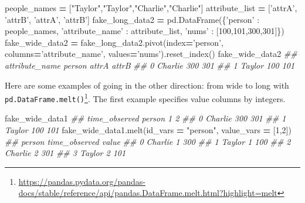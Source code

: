 \documentclass[12pt,krantz2]{krantz}
\makeatletter
\newenvironment{Shaded}{\begin{snugshade}}{\end{snugshade}}
\newcommand{\CommentTok}[1]{\textcolor[rgb]{0.37,0.37,0.37}{\textit{#1}}}
\newcommand{\DecValTok}[1]{\textcolor[rgb]{0.06,0.06,0.06}{#1}}
\newcommand{\NormalTok}[1]{#1}
\newcommand{\OperatorTok}[1]{\textcolor[rgb]{0.43,0.43,0.43}{\textbf{#1}}}
\newcommand{\StringTok}[1]{\textcolor[rgb]{0.5,0.5,0.5}{#1}}
\renewcommand{\href}[2]{#2\footnote{\url{#1}}}
\newenvironment{kframe}{%
\medskip{}
\setlength{\fboxsep}{.8em}
 \def\at@end@of@kframe{}%
 \ifinner\ifhmode%
  \def\at@end@of@kframe{\end{minipage}}%
  \begin{minipage}{\columnwidth}%
 \fi\fi%
 \def\FrameCommand##1{\hskip\@totalleftmargin \hskip-\fboxsep
 \colorbox{shadecolor}{##1}\hskip-\fboxsep
     \hskip-\linewidth \hskip-\@totalleftmargin \hskip\columnwidth}%
 \MakeFramed {\advance\hsize-\width
   \@totalleftmargin\z@ \linewidth\hsize
   \@setminipage}}%
 {\par\unskip\endMakeFramed%
 \at@end@of@kframe}
\renewenvironment{Shaded}{\begin{kframe}}{\end{kframe}}
\makeatother
\begin{document}
\begin{Shaded}
\begin{Highlighting}[]
\NormalTok{people_names }\OperatorTok{=}\NormalTok{ [}\StringTok{"Taylor"}\NormalTok{,}\StringTok{"Taylor"}\NormalTok{,}\StringTok{"Charlie"}\NormalTok{,}\StringTok{"Charlie"}\NormalTok{]}
\NormalTok{attribute_list }\OperatorTok{=}\NormalTok{ [}\StringTok{'attrA'}\NormalTok{, }\StringTok{'attrB'}\NormalTok{, }\StringTok{'attrA'}\NormalTok{, }\StringTok{'attrB'}\NormalTok{]}
\NormalTok{fake_long_data2 }\OperatorTok{=}\NormalTok{ pd.DataFrame(\{}\StringTok{'person'}\NormalTok{ : people_names, }
                               \StringTok{'attribute_name'}\NormalTok{ : attribute_list,}
                               \StringTok{'nums'}\NormalTok{ : [}\DecValTok{100}\NormalTok{,}\DecValTok{101}\NormalTok{,}\DecValTok{300}\NormalTok{,}\DecValTok{301}\NormalTok{]\})}
\NormalTok{fake_wide_data2 }\OperatorTok{=}\NormalTok{ fake_long_data2.pivot(index}\OperatorTok{=}\StringTok{'person'}\NormalTok{, }
\NormalTok{                                        columns}\OperatorTok{=}\StringTok{'attribute_name'}\NormalTok{, }
\NormalTok{                                        values}\OperatorTok{=}\StringTok{'nums'}\NormalTok{).reset_index()}
\NormalTok{fake_wide_data2}
\CommentTok{## attribute_name   person  attrA  attrB}
\CommentTok{## 0               Charlie    300    301}
\CommentTok{## 1                Taylor    100    101}
\end{Highlighting}
\end{Shaded}

Here are some examples of going in the other direction: from wide to long with \href{https://pandas.pydata.org/pandas-docs/stable/reference/api/pandas.DataFrame.melt.html?highlight=melt}{\texttt{pd.DataFrame.melt()}}. The first example specifies value columns by integers.

\begin{Shaded}
\begin{Highlighting}[]
\NormalTok{fake_wide_data1}
\CommentTok{## time_observed   person    1    2}
\CommentTok{## 0              Charlie  300  301}
\CommentTok{## 1               Taylor  100  101}
\NormalTok{fake_wide_data1.melt(id_vars }\OperatorTok{=} \StringTok{"person"}\NormalTok{, value_vars }\OperatorTok{=}\NormalTok{ [}\DecValTok{1}\NormalTok{,}\DecValTok{2}\NormalTok{])}
\CommentTok{##     person time_observed  value}
\CommentTok{## 0  Charlie             1    300}
\CommentTok{## 1   Taylor             1    100}
\CommentTok{## 2  Charlie             2    301}
\CommentTok{## 3   Taylor             2    101}
\end{Highlighting}
\end{Shaded}
\end{document}
